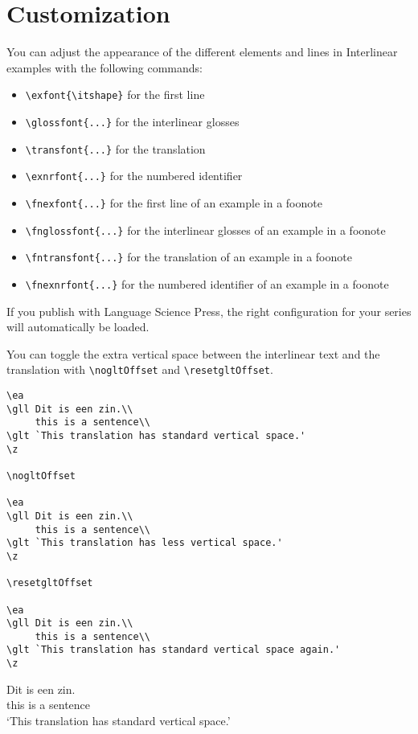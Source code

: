 \documentclass[output=paper]{langscibook}
\newcommand{\cmd}[1]{\texttt{\textbackslash#1}}
\begin{document}
\section{Customization}
You can adjust the appearance of the different elements and lines in Interlinear examples with the following commands:
\begin{itemize}
\item  \cmd{exfont\{\textbackslash itshape\}} for the first line
\item  \cmd{glossfont\{...\}} for the interlinear glosses
\item  \cmd{transfont\{...\}} for the translation
\item  \cmd{exnrfont\{...\}} for the numbered identifier
\medskip
\item  \cmd{fnexfont\{...\}} for the first line of an example in a foonote
\item  \cmd{fnglossfont\{...\}} for the interlinear glosses of an example in a foonote
\item  \cmd{fntransfont\{...\}} for the translation of an example in a foonote
\item  \cmd{fnexnrfont\{...\}} for the numbered identifier of an example in a foonote
\end{itemize}

If you publish with Language Science Press, the right configuration for your series will automatically be loaded.

You can toggle the extra vertical space between the interlinear text and the translation with \cmd{nogltOffset} and \cmd{resetgltOffset}.

\begin{lstlisting}
\ea
\gll Dit is een zin.\\
     this is a sentence\\
\glt `This translation has standard vertical space.'
\z

\nogltOffset

\ea
\gll Dit is een zin.\\
     this is a sentence\\
\glt `This translation has less vertical space.'
\z

\resetgltOffset

\ea
\gll Dit is een zin.\\
     this is a sentence\\
\glt `This translation has standard vertical space again.'
\z
\end{lstlisting}

\ea
\gll Dit is een zin.\\
     this is a sentence\\
\glt `This translation has standard vertical space.'
\z
\end{document}

